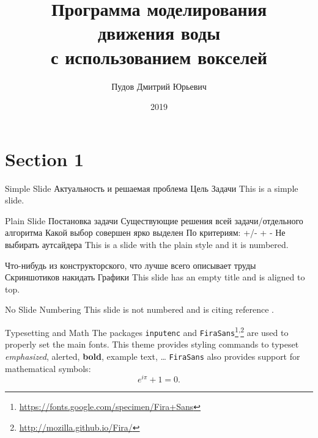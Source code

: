 \documentclass{beamer}
\title{Программа моделирования \\движения воды \\с использованием вокселей}
\author{Пудов Дмитрий Юрьевич}
\institute{МГТУ им. Н.Э. Баумана \\ Москва}
\date{2019}
\begin{document}

\begin{frame}
	\maketitle %
\end{frame}


\section{Section 1} %


\begin{frame}{Simple Slide}
	Актуальность и решаемая проблема
	Цель
	Задачи
	This is a simple slide.
\end{frame}


\begin{frame}[plain]{Plain Slide}
	Постановка задачи
	Существующие решения всей задачи/отдельного алгоритма
	Какой выбор совершен ярко выделен
	По критериям: +/- + -
	Не выбирать аутсайдера
	This is a slide with the plain style and it is numbered.
\end{frame}


\begin{frame}[t]
	Что-нибудь из конструкторского, что лучше всего описывает труды
	Скриншотиков накидать
	Графики
	This slide has an empty title and is aligned to top.
\end{frame}


\begin{frame}[noframenumbering]{No Slide Numbering}
	This slide is not numbered and is citing reference \cite{knuth74}.
\end{frame}


\begin{frame}{Typesetting and Math}
	The packages \texttt{inputenc} and \texttt{FiraSans}\footnote{\url{https://fonts.google.com/specimen/Fira+Sans}}\textsuperscript{,}\footnote{\url{http://mozilla.github.io/Fira/}} are used to properly set the main fonts.
	\vfill
	This theme provides styling commands to typeset \emph{emphasized}, \alert{alerted}, \textbf{bold}, \textcolor{example}{example text}, \dots
	\vfill
	\texttt{FiraSans} also provides support for mathematical symbols:
	\begin{equation*}
		e^{i\pi} + 1 = 0.
	\end{equation*}
\end{frame}
\end{document}
